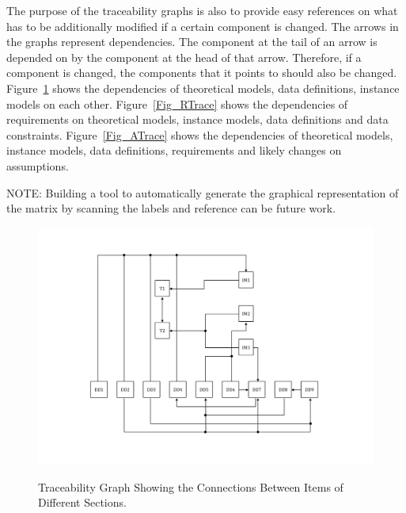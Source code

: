 \documentclass[12pt]{article}
\begin{document}
\newpage

The purpose of the traceability graphs is also to provide easy references 
on what has to be additionally modified if a certain component is changed.  
The arrows in the graphs represent dependencies. The component at the 
tail of an arrow is depended on by the component at the head of that arrow. 
Therefore, if a component is changed, the components that it points to should 
also be changed. Figure~\ref{Fig_Trace} shows the dependencies of 
theoretical models, data definitions, instance models on each other. 
Figure~\ref{Fig_RTrace} shows the dependencies of requirements on 
theoretical models, instance models, data definitions and data constraints.
Figure~\ref{Fig_ATrace} shows the dependencies of theoretical models,
instance models, data definitions, requirements and likely changes on assumptions.
 
NOTE: Building a tool to automatically generate the graphical 
representation of the matrix by scanning the labels and reference can be 
future work.

\begin{figure}[h!]
	\begin{center}
		{
			\includegraphics[width=\textwidth]{Trace.png}
		}
		\caption{\label{Fig_Trace} Traceability Graph Showing the Connections Between Items of Different Sections.}
	\end{center}
\end{figure}
\end{document}
